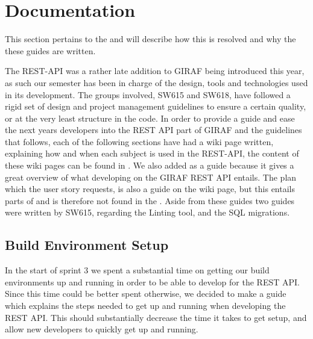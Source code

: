 \section{Documentation}
This section pertains to the  and will describe how this is resolved and why the these guides are written.

The REST-API was a rather late addition to GIRAF being introduced this year, as such our semester has been in charge of the design, tools and technologies used in its development.
The groups involved, SW615 and SW618, have followed a rigid set of design and project management guidelines to ensure a certain quality, or at the very least structure in the code.
In order to provide a guide and ease the next years developers into the REST API part of GIRAF and the guidelines that follows, each of the following sections have had a wiki page written, explaining how and when each subject is used in the REST-API, the content of these wiki pages can be found in .
We also added  as a guide because it gives a great overview of what developing on the GIRAF REST API entails.
The plan which the user story requests, is also a guide on the wiki page, but this entails parts of  and is therefore not found in the . 
Aside from these guides two guides were written by SW615, regarding the Linting tool, and the SQL migrations.

\subsection{Build Environment Setup}
In the start of sprint 3 we spent a substantial time on getting our build environments up and running in order to be able to develop for the REST API.
Since this time could be better spent otherwise, we decided to make a guide which explains the steps needed to get up and running when developing the REST API.
This should substantially decrease the time it takes to get setup, and allow new developers to quickly get up and running.

